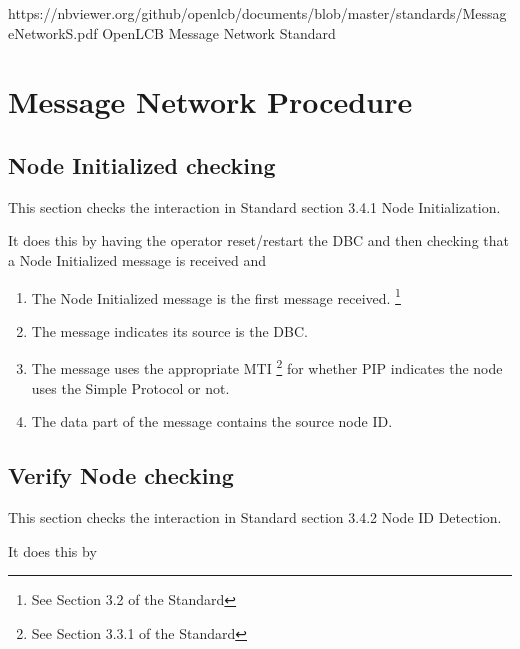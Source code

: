 



\maketitle
\thispagestyle{firststyle}

\introductionCaveats
    {https://nbviewer.org/github/openlcb/documents/blob/master/standards/MessageNetworkS.pdf}
    {OpenLCB Message Network Standard}

\section{Message Network Procedure}


\subsection{Node Initialized checking}

This section checks the interaction in Standard section 3.4.1 Node Initialization.

It does this by having the operator reset/restart the DBC and then
checking that a Node Initialized message is received and
    \begin{enumerate}
    \item The Node Initialized message is the first message received.
            \footnote{See Section 3.2 of the Standard}
    \item The message indicates its source is the DBC.
    \item The message uses the appropriate MTI
            \footnote{See Section 3.3.1 of the Standard}
            for whether PIP indicates the node 
            uses the Simple Protocol or not.
    \item The data part of the message contains the source node ID.
    \end{enumerate}


\subsection{Verify Node checking}

This section checks the interaction in Standard section 3.4.2 Node ID Detection.

It does this by

